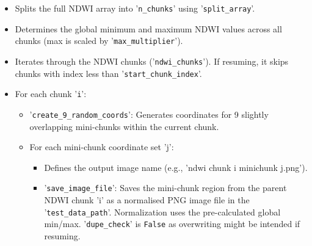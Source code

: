 \begin{itemize}
    \item Splits the full NDWI array into '\verb|n_chunks|' using '\verb|split_array|'.
    \item Determines the global minimum and maximum NDWI values across all chunks (max is scaled by '\verb|max_multiplier|').
    \item Iterates through the NDWI chunks ('\verb|ndwi_chunks|'). If resuming, it skips chunks with index less than '\verb|start_chunk_index|'.
    \item For each chunk '\verb|i|':
    \begin{itemize}
        \item '\verb|create_9_random_coords|': Generates coordinates for 9 slightly overlapping mini-chunks within the current chunk.
        \item For each mini-chunk coordinate set 'j':
        \begin{itemize}
            \item Defines the output image name (e.g., 'ndwi chunk i minichunk j.png').
            \item '\verb|save_image_file|': Saves the mini-chunk region from the parent NDWI chunk 'i' as a normalised PNG image file in the '\verb|test_data_path|'. Normalization uses the pre-calculated global min/max. '\verb|dupe_check|' is \verb|False| as overwriting might be intended if resuming.
        \end{itemize}
    \end{itemize}
\end{itemize}


